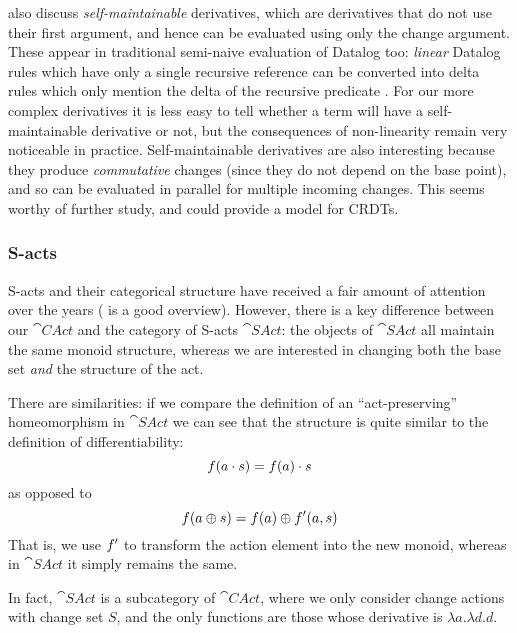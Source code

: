 \citeauthor{cai2014changes} also discuss \emph{self-maintainable} derivatives,
which are derivatives that do not use their first argument, and hence can be
evaluated using only the change argument. These appear in traditional semi-naive
evaluation of Datalog too: \emph{linear} Datalog rules which have only a single
recursive reference can be converted into delta rules which only mention the
delta of the recursive predicate \autocite[See][section
13.1]{abiteboul1995foundations}. For our more complex derivatives it is less
easy to tell whether a term will have a self-maintainable derivative or not, but
the consequences of non-linearity remain very noticeable in practice.
Self-maintainable derivatives are also interesting because they produce 
\emph{commutative} changes (since they do not depend on the base point), and so can be
evaluated in parallel for multiple incoming changes. This seems worthy of
further study, and could provide a model for CRDTs.

\subsubsection{S-acts}

S-acts and their categorical structure have received a fair amount of attention
over the years (\textcite{kilp2000monoids} is a good
overview). However, there is a key difference between our $\cat{CAct}$ and the category of
S-acts $\cat{SAct}$: the objects of $\cat{SAct}$ all maintain the same monoid
structure, whereas we are interested in changing both the base set \emph{and} the structure of the act.

There are similarities: if we compare the definition of an ``act-preserving''
homeomorphism in $\cat{SAct} $\autocite[See][]{kilp2000monoids} we can see that the structure is
quite similar to the definition of differentiability:
\begin{displaymath}
  f(a \cdot s) = f(a) \cdot s
\end{displaymath}
as opposed to
\begin{displaymath}
  f(a \oplus s) = f(a) \oplus f'(a, s)
\end{displaymath}
That is, we use $f'$ to transform the action element into the new
monoid, whereas in $\cat{SAct}$ it simply remains the same.

In fact, $\cat{SAct}$ is a subcategory of $\cat{CAct}$, where we only
consider change actions with change set $S$, and the only functions are those
whose derivative is $\lambda a. \lambda d. d$.

